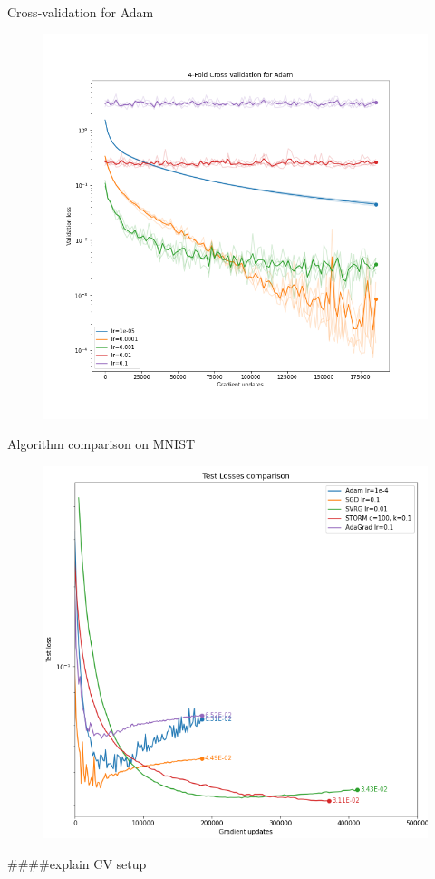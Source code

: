\documentclass[10pt]{beamer}
\begin{document}
\begin{frame}{Cross-validation for Adam}
    \begin{figure}
        \centering
    \includegraphics[scale=0.35]{midterm presentation/images/adamCV.png}
        \label{fig:adamCV}
    \end{figure}   
\end{frame}

\begin{frame}{Algorithm comparison on MNIST}
    \begin{figure}
        \centering
    \includegraphics[scale=0.35]{midterm presentation/images/testLossesMnist.png}
        \label{fig:testLossesMnist}
    \end{figure}   
\end{frame}
####explain CV setup
\end{document}
